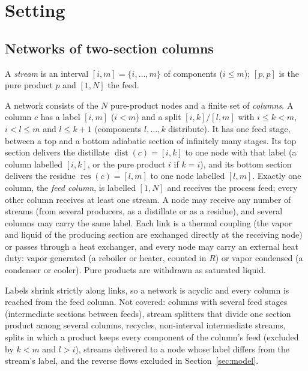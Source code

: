 \documentclass[11pt,a4paper]{report}
\newcommand{\dist}{\operatorname{dist}}
\newcommand{\res}{\operatorname{res}}
\begin{document}
\section{Setting}\label{sec:setting}

\subsection{Networks of two-section columns}
A \emph{stream} is an interval $[i,m]=\{i,\dots,m\}$ of components ($i\le m$); $[p,p]$ is the pure product $p$ and
$[1,N]$ the feed.

\begin{definition}\label{def:network}
A network consists of the $N$ pure-product nodes and a finite set of \emph{columns}. A column $c$ has a label $[i,m]$
($i<m$) and a split $[i,k]/[l,m]$ with $i\le k<m$, $i<l\le m$ and $l\le k+1$ (components $l,\dots,k$ distribute). It has
one feed stage, between a top and a bottom adiabatic section of infinitely many stages. Its top section delivers the
distillate $\dist(c)=[i,k]$ to one node with that label (a column labelled $[i,k]$, or the pure product $i$ if
$k=i$), and its bottom section delivers the residue $\res(c)=[l,m]$ to one node labelled $[l,m]$. Exactly one column,
the \emph{feed column}, is labelled $[1,N]$ and receives the process feed; every other column receives at least one
stream. A node may receive any number of streams (from several producers, as a distillate or as a residue), and
several columns may carry the same label. Each link is a thermal coupling (the vapor and liquid of the producing
section are exchanged directly at the receiving node) or passes through a heat exchanger, and every node may carry an
external heat duty: vapor generated (a reboiler or heater, counted in $R$) or vapor condensed (a condenser or
cooler). Pure products are withdrawn as saturated liquid.
\end{definition}

Labels shrink strictly along links, so a network is acyclic and every column is reached from the feed column. Not
covered: columns with several feed stages (intermediate sections between feeds), stream splitters that divide one
section product among several columns, recycles, non-interval intermediate streams, splits in which a product keeps
every component of the column's feed (excluded by $k<m$ and $l>i$), streams delivered to a node whose label differs
from the stream's label, and the reverse flows excluded in Section~\ref{sec:model}.
\end{document}
